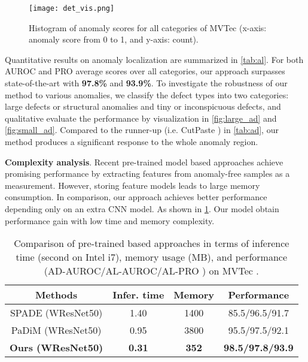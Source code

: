 \documentclass[10pt,twocolumn,letterpaper]{article}
\begin{document}
\begin{figure}[ht]
  \centering
   \texttt{[image: det\_vis.png]}
   \caption{Histogram of anomaly scores for all categories of MVTec \cite{mvtec} (x-axis: anomaly score from 0 to 1, and y-axis: count).} \label{fig:ad_vis}
\end{figure}

Quantitative results on anomaly localization are summarized in \cref{tab:al}. For both AUROC and PRO average scores over all categories, our approach surpasses state-of-the-art with \textbf{97.8\%} and \textbf{93.9\%}. To investigate the robustness of our method to various anomalies, we classify the defect types into two categories: large defects or structural anomalies and tiny or inconspicuous defects, and qualitative evaluate the performance by visualization in \cref{fig:large_ad} and \cref{fig:small_ad}. Compared to the runner-up (i.e. CutPaste \cite{cutpaste}) in \cref{tab:ad}, our method produces a significant response to the whole anomaly region. 

\textbf{Complexity analysis}. Recent pre-trained model based approaches achieve promising performance by extracting features from anomaly-free samples as a measurement\cite{padim,spade}. However, storing feature models leads to large memory consumption. In comparison, our approach achieves better performance depending only on an extra CNN model. As shown in \cref{tab:complexity}. Our model obtain performance gain with low time and memory complexity.
\begin{table}[ht]
\footnotesize
\centering
\begin{tabular}{c|c|c|c}
\hline
Methods & Infer. time & Memory & Performance \\ \hline
SPADE (WResNet50)    & 1.40                     & 1400                & 85.5/96.5/91.7     \\ \hline
PaDiM (WResNet50)        & 0.95                  & 3800             & 95.5/97.5/92.1          \\ \hline
\textbf{Ours (WResNet50)} & \textbf{0.31}         & \textbf{352}     & \textbf{98.5/97.8/93.9} \\ \hline
\end{tabular}
\caption{Comparison of pre-trained based approaches in terms of inference time (second on Intel i7), memory usage (MB), and performance (AD-AUROC/AL-AUROC/AL-PRO ) on MVTec \cite{mvtec}.}
\label{tab:complexity}
\end{table}
\end{document}
